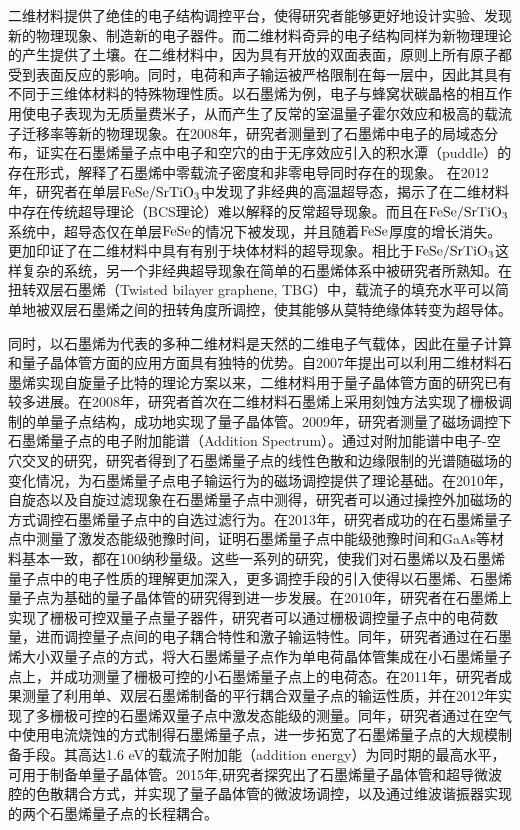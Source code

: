 二维材料提供了绝佳的电子结构调控平台，使得研究者能够更好地设计实验、发现新的物理现象、制造新的电子器件。而二维材料奇异的电子结构同样为新物理理论的产生提供了土壤。在二维材料中，因为具有开放的双面表面，原则上所有原子都受到表面反应的影响。同时，电荷和声子输运被严格限制在每一层中，因此其具有不同于三维体材料的特殊物理性质。以石墨烯为例，电子与蜂窝状碳晶格的相互作用使电子表现为无质量费米子，从而产生了反常的室温量子霍尔效应和极高的载流子迁移率等新的物理现象。在2008年，研究者测量到了石墨烯中电子的局域态分布，证实在石墨烯量子点中电子和空穴的由于无序效应引入的积水潭（puddle）的存在形式，解释了石墨烯中零载流子密度和非零电导同时存在的现象。%
在2012年，研究者在单层$\rm{FeSe/SrTiO_{3}}$中发现了非经典的高温超导态，揭示了在二维材料中存在传统超导理论（BCS理论）难以解释的反常超导现象。而且在$\rm{FeSe/SrTiO_{3}}$系统中，超导态仅在单层$\rm{FeSe}$的情况下被发现，并且随着$\rm{FeSe}$厚度的增长消失。更加印证了在二维材料中具有有别于块体材料的超导现象。相比于$\rm{FeSe/SrTiO_{3}}$这样复杂的系统，另一个非经典超导现象在简单的石墨烯体系中被研究者所熟知。在扭转双层石墨烯（Twisted bilayer graphene, TBG）中，载流子的填充水平可以简单地被双层石墨烯之间的扭转角度所调控，使其能够从莫特绝缘体转变为超导体。

同时，以石墨烯为代表的多种二维材料是天然的二维电子气载体，因此在量子计算和量子晶体管方面的应用方面具有独特的优势。自2007年提出可以利用二维材料石墨烯实现自旋量子比特的理论方案以来，二维材料用于量子晶体管方面的研究已有较多进展。在2008年，研究者首次在二维材料石墨烯上采用刻蚀方法实现了栅极调制的单量子点结构，成功地实现了量子晶体管。2009年，研究者测量了磁场调控下石墨烯量子点的电子附加能谱（Addition Spectrum）。通过对附加能谱中电子-空穴交叉的研究，研究者得到了石墨烯量子点的线性色散和边缘限制的光谱随磁场的变化情况，为石墨烯量子点电子输运行为的磁场调控提供了理论基础。在2010年，自旋态以及自旋过滤现象在石墨烯量子点中测得，研究者可以通过操控外加磁场的方式调控石墨烯量子点中的自选过滤行为。在2013年，研究者成功的在石墨烯量子点中测量了激发态能级弛豫时间，证明石墨烯量子点中能级弛豫时间和GaAs等材料基本一致，都在100纳秒量级。这些一系列的研究，使我们对石墨烯以及石墨烯量子点中的电子性质的理解更加深入，更多调控手段的引入使得以石墨烯、石墨烯量子点为基础的量子晶体管的研究得到进一步发展。在2010年，研究者在石墨烯上实现了栅极可控双量子点量子器件，研究者可以通过栅极调控量子点中的电荷数量，进而调控量子点间的电子耦合特性和激子输运特性。同年，研究者通过在石墨烯大小双量子点的方式，将大石墨烯量子点作为单电荷晶体管集成在小石墨烯量子点上，并成功测量了栅极可控的小石墨烯量子点上的电荷态。在2011年，研究者成果测量了利用单、双层石墨烯制备的平行耦合双量子点的输运性质，并在2012年实现了多栅极可控的石墨烯双量子点中激发态能级的测量。同年，研究者通过在空气中使用电流烧蚀的方式制得石墨烯量子点，进一步拓宽了石墨烯量子点的大规模制备手段。其高达1.6 eV的载流子附加能（addition energy）为同时期的最高水平，可用于制备单量子晶体管。2015年,研究者探究出了石墨烯量子晶体管和超导微波腔的色散耦合方式，并实现了量子晶体管的微波场调控，以及通过维波谐振器实现的两个石墨烯量子点的长程耦合。

